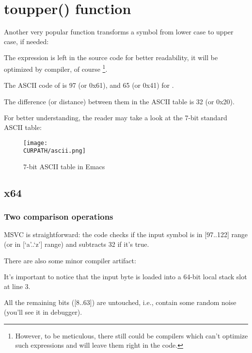 \section{toupper() function}

Another very popular function transforms a symbol from lower case to upper case, if needed:



The  expression is left in the source code for better readability, it will be 
optimized by compiler, of course
\footnote{However, to be meticulous, there still could be compilers which can't optimize such expressions
and will leave them right in the code.}.

The \ac{ASCII} code of  is 97 (or 0x61), and 65 (or 0x41) for .

The difference (or distance) between them in the \ac{ASCII} table is 32 (or 0x20).

For better understanding, the reader may take a look at the 7-bit standard \ac{ASCII} table:

\begin{figure}[H]
\centering
\texttt{[image: \\CURPATH/ascii.png]}
\caption{7-bit \ac{ASCII} table in Emacs}
\end{figure}

\subsection{x64}

\subsubsection{Two comparison operations}

\NonOptimizing MSVC is straightforward: the code checks if the input symbol is in [97..122] range 
(or in [`a'..`z'] range) and subtracts 32 if it's true.

There are also some minor compiler artifact:



It's important to notice that the input byte is loaded into a 64-bit local stack slot at line 3.

All the remaining bits ([8..63]) are untouched, i.e., contain some random noise (you'll see it in debugger).

